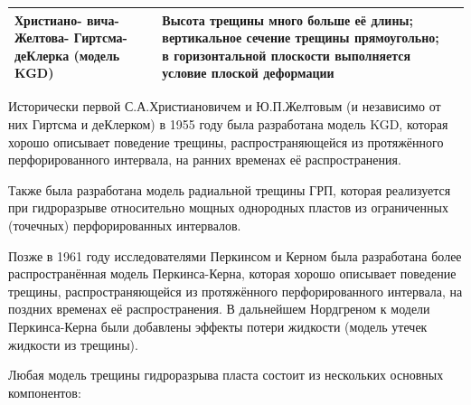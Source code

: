 \begin{longtable}[l]{|L{2.2cm}|m{7.3cm}|L{6.2cm}|}
	Христиано- вича- Желтова- Гиртсма- деКлерка (модель KGD)&Высота трещины много больше её длины; вертикальное сечение трещины прямоугольно; в горизонтальной плоскости выполняется условие плоской деформации&\hfill\break{}\hfill\break\\ \hline
	
\end{longtable}
\normalsize%
\endgroup

Исторически первой С.А.Христиановичем и Ю.П.Желтовым (и независимо от них Гиртсма и деКлерком) в 1955 году была разработана модель KGD, которая хорошо описывает поведение трещины, распространяющейся из протяжённого перфорированного интервала, на ранних временах её распространения.

Также была разработана модель радиальной трещины ГРП, которая реализуется при гидроразрыве относительно мощных однородных пластов из ограниченных (точечных) перфорированных интервалов.

Позже в 1961 году исследователями Перкинсом и Керном была разработана более распространённая модель Перкинса-Керна, которая хорошо описывает поведение трещины, распространяющейся из протяжённого перфорированного интервала, на поздних временах её распространения.
В дальнейшем Нордгреном к модели Перкинса-Керна были добавлены эффекты потери жидкости (модель утечек жидкости из трещины).

Любая модель трещины гидроразрыва пласта состоит из нескольких основных компонентов:

